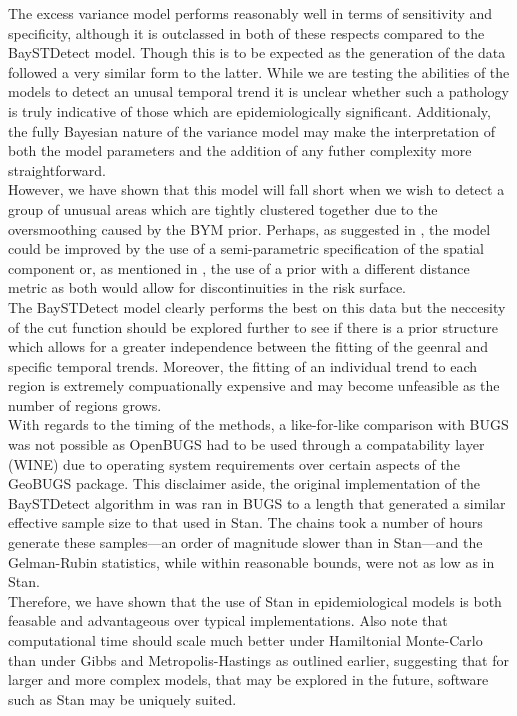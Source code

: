 \documentclass[11pt]{report}
\begin{document}
The excess variance model performs reasonably well in terms of sensitivity and specificity, although it is outclassed in both of these respects compared to the BaySTDetect model. Though this is to be expected as the generation of the data followed a very similar form to the latter. While we are testing the abilities of the models to detect an unusal temporal trend it is unclear whether such a pathology is truly indicative of those which are epidemiologically significant. Additionaly, the fully Bayesian nature of the variance model may make the interpretation of both the model parameters and the addition of any futher complexity more straightforward. \\

However, we have shown that this model will fall short when we wish to detect a group of unusual areas which are tightly clustered together due to the oversmoothing caused by the BYM prior. Perhaps, as suggested in \cite{best2005comparison}, the model could be improved by the use of a semi-parametric specification of the spatial component or, as mentioned in \cite{bym}, the use of a prior with a different distance metric as both would allow for discontinuities in the risk surface. \\

The BaySTDetect model clearly performs the best on this data but the neccesity of the cut function should be explored further to see if there is a prior structure which allows for a greater independence between the fitting of the geenral and specific temporal trends. Moreover, the fitting of an individual trend to each region is extremely compuationally expensive and may become unfeasible as the number of regions grows. \\

With regards to the timing of the methods, a like-for-like comparison with BUGS was not possible as OpenBUGS had to be used through a compatability layer (WINE) due to operating system requirements over certain aspects of the GeoBUGS package. This disclaimer aside, the original implementation of the BaySTDetect algorithm in \citet{baystdetect} was ran in BUGS to a length that generated a similar effective sample size to that used in Stan. The chains took a number of hours generate these samples---an order of magnitude slower than in Stan---and the Gelman-Rubin statistics, while within reasonable bounds, were not as low as in Stan. \\

Therefore, we have shown that the use of Stan in epidemiological models is both feasable and advantageous over typical implementations. Also note that computational time should scale much better under Hamiltonial Monte-Carlo than under Gibbs and Metropolis-Hastings as outlined earlier, suggesting that for larger and more complex models, that may be explored in the future, software such as Stan may be uniquely suited.
\end{document}
